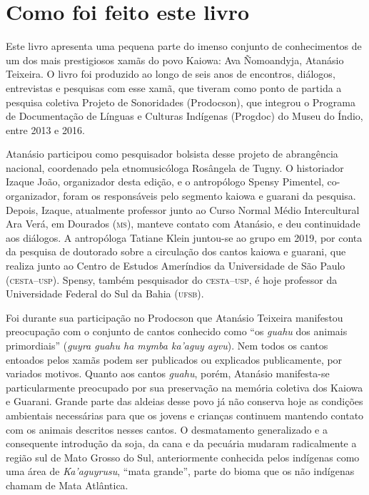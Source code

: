 \chapter{Como foi feito este livro}

Este livro apresenta uma pequena parte do imenso conjunto de
conhecimentos de um dos mais prestigiosos xamãs do povo Kaiowa: Ava
Ñomoandyja, Atanásio Teixeira. O livro foi produzido ao longo de seis
anos de encontros, diálogos, entrevistas e pesquisas com esse xamã, que
tiveram como ponto de partida a pesquisa coletiva Projeto de Sonoridades
(Prodocson), que integrou o Programa de Documentação de Línguas e
Culturas Indígenas (Progdoc) do Museu do Índio, entre 2013 e 2016.

Atanásio participou como pesquisador bolsista desse projeto de
abrangência nacional, coordenado pela etnomusicóloga Rosângela de Tugny.
O historiador Izaque João, organizador desta edição, e o antropólogo
Spensy Pimentel, co-organizador, foram os responsáveis pelo segmento
kaiowa e guarani da pesquisa. Depois, Izaque, atualmente
professor junto ao Curso Normal Médio Intercultural Ara Verá, em
Dourados (\textsc{ms}), manteve contato com Atanásio, e deu continuidade aos
diálogos. A antropóloga Tatiane Klein juntou-se ao grupo em 2019, por
conta da pesquisa de doutorado sobre a circulação dos cantos kaiowa e
guarani, que realiza junto ao Centro de Estudos Ameríndios da
Universidade de São Paulo (\textsc{cesta}--\textsc{usp}). Spensy, também pesquisador do
\textsc{cesta}--\textsc{usp}, é hoje professor da Universidade Federal do Sul da Bahia
(\textsc{ufsb}).

Foi durante sua participação no Prodocson que Atanásio Teixeira
manifestou preocupação com o conjunto de cantos conhecido como ``os
\textit{guahu} dos animais primordiais'' (\textit{guyra guahu ha
mymba ka'aguy ayvu}). Nem todos os cantos entoados pelos xamãs podem ser
publicados ou explicados publicamente, por variados motivos. Quanto aos
cantos \textit{guahu}, porém, Atanásio manifesta-se particularmente
preocupado por sua preservação na memória coletiva dos Kaiowa e Guarani.
Grande parte das aldeias desse povo já não conserva hoje as condições
ambientais necessárias para que os jovens e crianças continuem mantendo
contato com os animais descritos nesses cantos. O desmatamento
generalizado e a consequente introdução da soja, da cana e da pecuária
mudaram radicalmente a região sul de Mato Grosso do Sul, anteriormente
conhecida pelos indígenas como uma área de \textit{Ka'aguyrusu}, ``mata
grande'', parte do bioma que os não indígenas chamam de Mata Atlântica.

